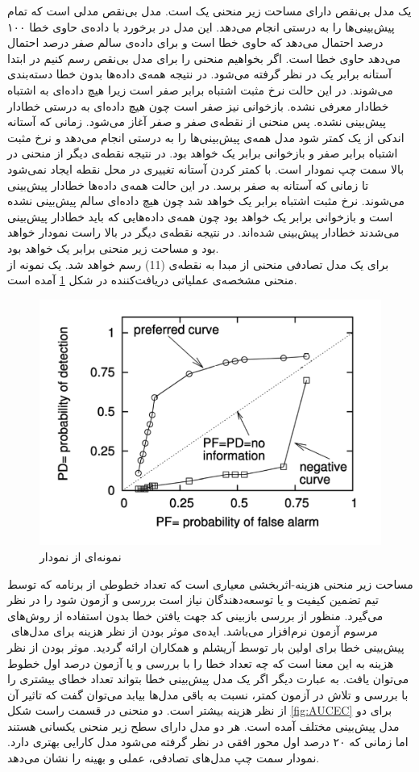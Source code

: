 یک مدل بی‌نقص دارای مساحت زیر منحنی یک است.  مدل بی‌نقص مدلی است که تمام پیش‌بینی‌ها را به درستی انجام می‌دهد. این مدل  در برخورد با داده‌ی حاوی خطا ۱۰۰ درصد احتمال می‌دهد که حاوی خطا است  و برای داده‌ی سالم صفر درصد احتمال می‌دهد حاوی خطا است. اگر بخواهیم منحنی را برای مدل بی‌نقص رسم کنیم در ابتدا آستانه  برابر یک  در نظر گرفته می‌شود. در نتیجه همه‌ی داده‌ها بدون خطا دسته‌بندی می‌شوند. در این حالت نرخ مثبت اشتباه برابر صفر است زیرا هیچ داده‌ای به اشتباه خطادار معرفی نشده. بازخوانی نیز صفر است چون هیچ داده‌ای به درستی خطادار پیش‌بینی نشده. پس منحنی از نقطه‌ی صفر و صفر آغاز می‌شود. زمانی که آستانه اندکی از یک کمتر شود مدل همه‌ی پیش‌بینی‌ها را به درستی انجام می‌دهد و نرخ مثبت اشتباه برابر صفر و بازخوانی برابر یک خواهد بود. در نتیجه نقطه‌ی دیگر  از منحنی در بالا سمت چپ نمودار است. با کمتر کردن آستانه تغییری در محل نقطه ایجاد نمی‌شود تا زمانی که آستانه به صفر برسد. در این حالت همه‌ی داده‌ها خطادار پیش‌بینی می‌شوند. نرخ مثبت اشتباه برابر یک خواهد شد چون هیچ داده‌ای سالم پیش‌بینی نشده است و بازخوانی برابر یک خواهد بود چون همه‌ی داده‌هایی که باید خطادار پیش‌بینی می‌شدند خطا‌دار پیش‌بینی شده‌اند. در نتیجه نقطه‌ی دیگر در بالا راست نمودار خواهد بود و مساحت زیر منحنی برابر یک خواهد بود. \\

برای یک مدل تصادفی  منحنی از مبدا به نقطه‌ی (1\lr{,}1) رسم خواهد شد. یک نمونه از منحنی مشخصه‌ی عملیاتی دریافت‌کننده در شکل \ref{fig:ROC} آمده است. \\

\begin{figure}
	\centering
	\includegraphics[width=.60\textwidth]{img/ROC.PNG}
	\caption{ نمونه‌ای از نمودار  \cite{menzies2007data}}
	\label{fig:ROC}
\end{figure}

 مساحت زیر منحنی هزینه-اثربخشی معیاری است که تعداد خطوطی از برنامه که  توسط تیم تضمین کیفیت و یا توسعه‌دهندگان نیاز است بررسی و آزمون شود را در نظر می‌گیرد. منظور از بررسی بازبینی کد جهت یافتن خطا بدون استفاده از روش‌های مرسوم آزمون نرم‌افزار می‌باشد. ایده‌ی  موثر بودن از نظر هزینه
برای مدل‌های ‌‌ پیش‌بینی خطا برای اولین بار توسط آریشلم و همکاران \cite{arisholm2007data} ارائه گردید. موثر بودن از نظر هزینه به این معنا است که چه تعداد خطا  را با بررسی و یا آزمون    درصد اول خطوط می‌توان یافت. به عبارت دیگر اگر یک مدل پیش‌بینی خطا بتواند تعداد خطای بیشتری را با بررسی و تلاش در آزمون کمتر، نسبت به باقی مدل‌ها بیابد می‌توان گفت که تاثیر آن از نظر هزینه بیشتر است. دو منحنی در  قسمت راست شکل \ref{fig:AUCEC} برای دو مدل پیش‌بینی مختلف آمده است. هر دو مدل دارای سطح زیر منحنی یکسانی هستند اما زمانی که ۲۰ درصد اول محور افقی در نظر گرفته می‌شود مدل 
  کارایی بهتری دارد. نمودار سمت چپ مدل‌های تصادفی، عملی و بهینه را نشان می‌دهد.

